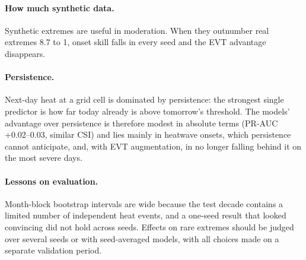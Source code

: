 \documentclass[11pt,a4paper]{article}
\begin{document}
\paragraph{How much synthetic data.} Synthetic extremes are useful in moderation. When they outnumber real
extremes 8.7 to 1, onset skill falls in every seed and the EVT advantage disappears.

\paragraph{Persistence.} Next-day heat at a grid cell is dominated by persistence: the strongest single predictor
is how far today already is above tomorrow's threshold. The models' advantage over persistence is therefore
modest in absolute terms (PR-AUC +0.02--0.03, similar CSI) and lies mainly in heatwave onsets, which persistence
cannot anticipate, and, with EVT augmentation, in no longer falling behind it on the most severe days.

\paragraph{Lessons on evaluation.} Month-block bootstrap intervals are wide because the test decade contains a
limited number of independent heat events, and a one-seed result that looked convincing did not hold across
seeds. Effects on rare extremes should be judged over several seeds or with seed-averaged models, with all
choices made on a separate validation period.
\end{document}

